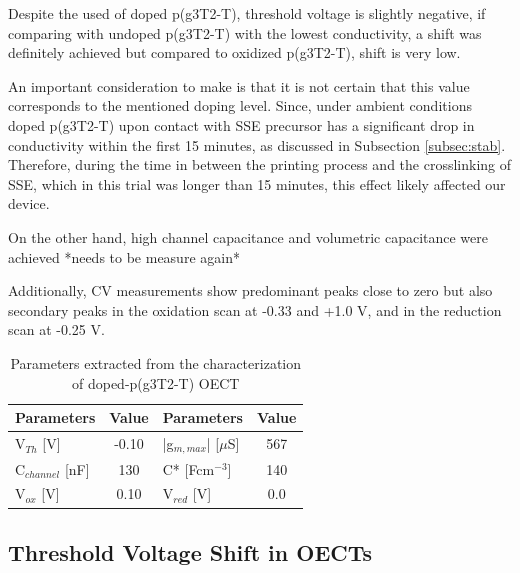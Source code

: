 Despite the used of doped p(g3T2-T), threshold voltage is slightly negative, if comparing with undoped p(g3T2-T) with the lowest conductivity, a shift was definitely achieved but compared to oxidized p(g3T2-T), shift is very low. 

An important consideration to make is that it is not certain that this value corresponds to the mentioned doping level. Since, under ambient conditions doped p(g3T2-T) upon contact with SSE precursor has a significant drop in conductivity within the first 15 minutes, as discussed in Subsection \ref{subsec:stab}. Therefore, during the time in between the printing process and the crosslinking of SSE, which in this trial was longer than 15 minutes, this effect likely affected our device.

On the other hand, high channel capacitance and volumetric capacitance were achieved *needs to be measure again*

Additionally, CV measurements show predominant peaks close to zero but also secondary peaks in the oxidation scan at -0.33 and +1.0 V, and in the reduction scan at -0.25 V. 

\begin{table}[ht]
\centering
\caption{Parameters extracted from the characterization of doped-p(g3T2-T) OECT}
\begin{tabular}{l|c||l|c}
Parameters & Value & Parameters & Value \\\hline \hline
V$_{Th}$ [V] & -0.10 & |g$_{m,max}$| [$\mu$S] & 567 \\
C$_{channel}$ [nF] & 130 & C* [Fcm$^{-3}$] &  140 \\
V$_{ox}$ [V] & 0.10 & V$_{red}$ [V] & 0.0 \\\hline
\end{tabular}
\label{tab:dopedfom}
\end{table}



\newpage

\subsection{Threshold Voltage Shift in OECTs} \label{subsec:vth_shift}



